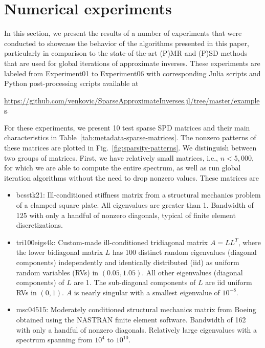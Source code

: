 \documentclass[numbers,webpdf,imanum]{ima-authoring-template}%
\theoremstyle{thmstyletwo}%
\numberwithin{equation}{section}
\begin{document}
\section{Numerical experiments}\label{sec:numerical-experiments}
In this section, we present the results of a number of experiments that were conducted to showcase the behavior of the algorithms presented in this paper, particularly in comparison to the state-of-the-art (P)MR and (P)SD methods that are used for global iterations of approximate inverses. 
These experiments are labeled from Experiment01 to Experiment06 with corresponding Julia scripts and Python post-processing scripts available at 
\begin{center}
\href{https://github.com/venkovic/SparseApproximateInverses.jl/tree/master/examples}{https://github.com/venkovic/SparseApproximateInverses.jl/tree/master/examples}.
\end{center}
For these experiments, we present 10 test sparse SPD matrices and their main characteristics in Table~\ref{tab:metadata-sparse-matrices}.
The nonzero patterns of these matrices are plotted in Fig.~\ref{fig:sparsity-patterns}.
We distinguish between two groups of matrices.
First, we have relatively small matrices, i.e., $n<5{,}000$, for which we are able to compute the entire spectrum, as well as run global iteration algorithms without the need to drop nonzero values.
These matrices are
\begin{itemize}
\item[-] bcsstk21: Ill-conditioned stiffness matrix from a structural mechanics problem of a clamped square plate. 
All eigenvalues are greater than 1.
Bandwidth of 125 with only a handful of nonzero diagonals, typical of finite element 
discretizations.
\item[-] tri100eigs4k: Custom-made ill-conditioned tridiagonal matrix $A=LL^T$, where the lower bidiagonal matrix $L$ has 100 distinct random eigenvalues (diagonal components) independently and identically distributed (iid) as uniform random variables (RVs) in $(0.05,1.05)$. All other eigenvalues (diagonal components) of $L$ are 1. 
The sub-diagonal components of $L$ are iid uniform RVs in $(0,1)$.
$A$ is nearly singular with a smallest eigenvalue of $10^{-8}$.
\item[-] msc04515: Moderately conditioned structural mechanics matrix from Boeing obtained using the NASTRAN finite element software.
Bandwidth of 162 with only a handful of nonzero diagonals.
Relatively large eigenvalues with a spectrum spanning from $10^4$ to $10^{10}$.
\end{itemize}
\end{document}
